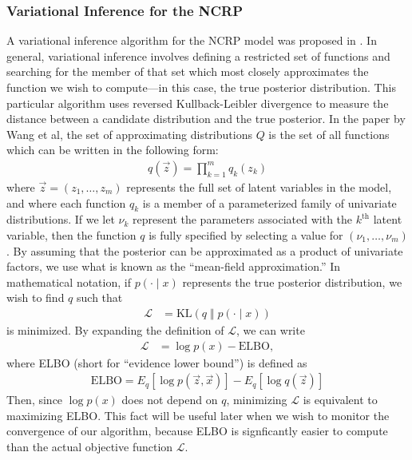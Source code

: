 \documentclass{article}
\newcommand{\nth}{^{\text{th}}}
\begin{document}

\subsubsection{Variational Inference for the NCRP}

A variational inference algorithm for the NCRP model was proposed in \cite{wang2009vi_ncrp}.
In general, variational inference involves defining a restricted set of functions and searching for the member of that set which most closely approximates the function we wish to compute---in this case, the true posterior distribution.
This particular algorithm uses reversed Kullback-Leibler divergence to measure the distance between a candidate distribution and the true posterior.
In the paper by Wang et al, the set of approximating distributions $Q$ is the set of all functions which can be written in the following form:
\begin{align}
q(\vec z) = \prod_{k=1}^m q_k(z_k)
\end{align}
where $\vec z = (z_1, \ldots, z_m)$ represents the full set of latent variables in the model, and where each function $q_k$ is a member of a parameterized family of univariate distributions.
If we let $\nu_k$ represent the parameters associated with the $k\nth$ latent variable, then the function $q$ is fully specified by selecting a value for $(\nu_1, \ldots, \nu_m)$.
By assuming that the posterior can be approximated as a product of univariate factors, we use what is known as the ``mean-field approximation.''
In mathematical notation, if $p(\cdot \mid x)$ represents the true posterior distribution, we wish to find $q$ such that
\begin{align}
\mathcal L &= \text{KL}( q \;\Vert\; p(\cdot \mid x) )
\end{align}
is minimized.
By expanding the definition of $\mathcal L$, we can write
\begin{align}
\mathcal L &= \log p(x) - \text{ELBO},
\end{align}
where ELBO (short for ``evidence lower bound'') is defined as
\begin{align}
\text{ELBO} = E_q[\log p(\vec z, \vec x)] - E_q[\log q(\vec z)]
\end{align}
Then, since $\log p(x)$ does not depend on $q$, minimizing $\mathcal L$ is equivalent to maximizing ELBO.
This fact will be useful later when we wish to monitor the convergence of our algorithm, because ELBO is signficantly easier to compute than the actual objective function $\mathcal L$.
\end{document}
